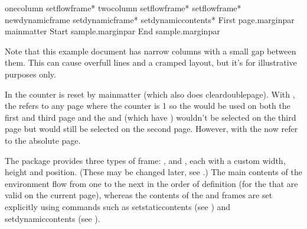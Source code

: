 \documentclass[fontsize=12pt]{scrbook}
\begin{document}
{%
\nl
{}\nl
{}%
\gls{onecolumn}%
\gls{setflowframe}*\nl
\gls{twocolumn}%
\gls{setflowframe}*\nl
\gls{setflowframe}*\nl
\gls{newdynamicframe}\marg{2in}\nlsp
 \marg{0pt}\nl
{}\nl
\gls{setdynamicframe}*\nlsp
\codepar
\gls{setdynamiccontents}*
}
{%
First page.\gls{marginpar}\nl
\gls{mainmatter}\nl
Start sample.\gls{marginpar}\nl
{}\nl
End sample.\gls{marginpar}
}

Note that this example document has narrow columns with a small gap
between them. This can cause overfull lines and a cramped layout,
but it's for illustrative purposes only.

In  the  counter is reset by \gls{mainmatter}
(which also does \gls{cleardoublepage}).
With , the   refers
to any page where the  counter is 1 so the 
 would be used on both the first and third page and
the  and   (which have
 ) wouldn't be selected on the third page but
would still be selected on the second page. However, with
 the  now refer to the
absolute page.

The  package provides three types of \gls{frame}:
,  and ,
each with a custom width, height and position. (These may be changed
later, see .)
The main contents of the  environment flow from
one  to the next in the order of definition
(for the  that are valid on the current page),
whereas the contents of the  and  frames
are set explicitly using commands such as \gls{setstaticcontents}
(see )
and \gls{setdynamiccontents} (see ).
\end{document}
